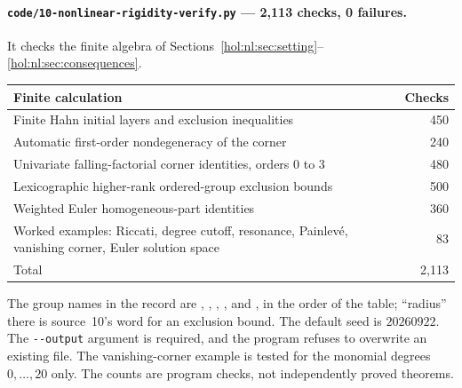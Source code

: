 \documentclass[11pt]{article}
\numberwithin{equation}{section}
\theoremstyle{definition}
\theoremstyle{remark}
\begin{document}
\paragraph{\texttt{code/10-nonlinear-rigidity-verify.py} --- 2{,}113 checks,
0 failures.}
It checks the finite algebra of
Sections~\ref{hol:nl:sec:setting}--\ref{hol:nl:sec:consequences}.
\begin{center}
\begin{tabularx}{\textwidth}{@{}X r@{}}
\toprule
Finite calculation & Checks\\
\midrule
Finite Hahn initial layers and exclusion inequalities & 450\\
Automatic first-order nondegeneracy of the corner & 240\\
Univariate falling-factorial corner identities, orders $0$ to $3$ & 480\\
Lexicographic higher-rank ordered-group exclusion bounds & 500\\
Weighted Euler homogeneous-part identities & 360\\
Worked examples: Riccati, degree cutoff, resonance, Painlev\'e, vanishing
corner, Euler solution space & 83\\
\midrule
Total & 2{,}113\\
\bottomrule
\end{tabularx}
\end{center}
The group names in the record 
are , ,
, ,
 and , in the order of the
table; ``radius'' there is source~10's word for an exclusion bound. The
default seed is $20260922$. The \verb|--output| argument is required, and the
program refuses to overwrite an existing file. The vanishing-corner example
is tested for the monomial degrees $0,\ldots,20$ only. The counts are program
checks, not independently proved theorems.
\end{document}
